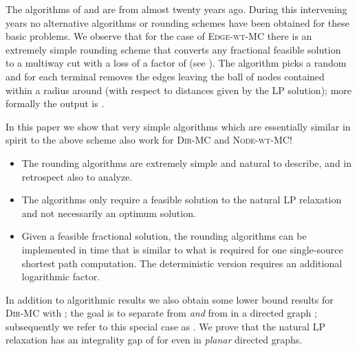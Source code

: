 \documentclass[11pt]{article}
\def\MC{\textsc{Edge-wt-MC}\xspace}
\def\DirMC{\textsc{Dir-MC}\xspace}
\def\2DirMC{\text{-Bi-Cut}\xspace}
\def\NodeMC{\textsc{Node-wt-MC}\xspace}
\def\NodeMC{\textsc{Node-wt-MC}\xspace}
\begin{document}
The algorithms of \cite{GargVY04} and \cite{NaorZ01} are from almost
twenty years ago. During this intervening years no alternative
algorithms or rounding schemes have been obtained for these basic
problems. We observe that for the case of \MC there is an extremely
simple rounding scheme that converts any fractional feasible solution
to a multiway cut with a loss of a factor of  (see
\cite{Vazirani-book}). The algorithm picks a random  and for each terminal  removes the edges leaving the
ball  of nodes contained within a radius 
around  (with respect to distances given by the LP solution);
more formally the output is .

In this paper we show that very simple algorithms which are essentially
similar in spirit to the above scheme also work for \DirMC and \NodeMC!
\begin{itemize}
\item The rounding algorithms are extremely simple and natural to
  describe, and in retrospect also to analyze. 
\item The algorithms only require a feasible solution to the natural
  LP relaxation and not necessarily an optimum solution.
\item Given a feasible fractional solution, the rounding algorithms
  can be implemented in time that is similar to what is required for
  one single-source shortest path computation. The deterministic
  version requires an additional logarithmic factor.
\end{itemize}

In addition to algorithmic results we also obtain some lower bound
results for \DirMC with ; the goal is to separate  from 
{\em and}  from  in a directed graph ; subsequently 
we refer to this special case as \2DirMC. We prove that the
natural LP relaxation has an integrality gap of  for
\2DirMC even in {\em planar} directed graphs.
\end{document}
